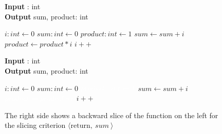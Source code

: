 \begin{figure}
    \centering
    \begin{minipage}{.4\textwidth}
        \begin{algorithm}[H]
            \hspace*{\algorithmicindent} \textbf{Input} \In: int \\
            \hspace*{\algorithmicindent} \textbf{Output} sum, product: int \\
            \hspace*{.5em}
            \begin{algorithmic}
                \State $i: int \leftarrow 0$
                \State $sum: int \leftarrow 0$
                \State $product: int \leftarrow 1$
                    \State $sum \leftarrow sum + i$
                    \State $product \leftarrow product * i$
                    \State $i++$
                \EndWhile\\
                \Return
            \end{algorithmic}
        \end{algorithm}
    \end{minipage}
    \hfill
    \begin{minipage}{.4\textwidth}
        \begin{algorithm}[H]
            \hspace*{\algorithmicindent} \textbf{Input} \In: int \\
            \hspace*{\algorithmicindent} \textbf{Output} sum, product: int \\
            \hspace*{.5em}
            \begin{algorithmic}
                \State $i: int \leftarrow 0$
                \State $sum: int \leftarrow 0$
                \State $\color{white} product: int \leftarrow 1$
                    \State $sum \leftarrow sum + i$
                    \State $\color{white} product \leftarrow product * i$
                    \State $i++$
                \EndWhile\\
                \Return
            \end{algorithmic}
        \end{algorithm}
    \end{minipage}
    \caption{The right side shows a backward slice of the function on the left for the slicing criterion $\langle \text{return}, \: sum \: \rangle$}
    \label{fig:slice}

\end{figure}


